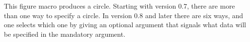 \documentclass[letterpaper]{article}
\begin{document}
\begin{cd}
%
%
\end{cd}

This figure macro produces a circle. Starting with \mfp{} version 0.7,
there are more than one way to specify a circle. In version 0.8 and
later there are six ways, and one selects which one by giving
 an optional argument that signals what data will be
specified in the mandatory argument.

\begin{cd}
\\
\\
\\
\\
\\
%
%
\end{cd}
\end{document}
